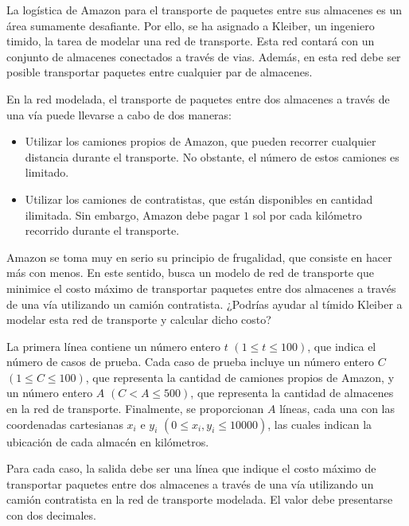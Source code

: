 
La logística de Amazon para el transporte de paquetes entre sus almacenes es un área sumamente desafiante. Por ello, se ha asignado a Kleiber, un ingeniero timido, la tarea de modelar una red de transporte. Esta red contará con un conjunto de almacenes conectados a través de vias. Además, en esta red debe ser posible transportar paquetes entre cualquier par de almacenes.

En la red modelada, el transporte de paquetes entre dos almacenes a través de una vía puede llevarse a cabo de dos maneras:
 \begin{itemize}
    \item Utilizar los camiones propios de Amazon, que pueden recorrer cualquier distancia durante el transporte. No obstante, el número de estos camiones es limitado.
    \item Utilizar los camiones de contratistas, que están disponibles en cantidad ilimitada. Sin embargo, Amazon debe pagar $1$ sol por cada kilómetro recorrido durante el transporte.
\end{itemize}
Amazon se toma muy en serio su principio de frugalidad, que consiste en hacer más con menos. En este sentido, busca un modelo de red de transporte que minimice el costo máximo de transportar paquetes entre dos almacenes a través de una vía utilizando un camión contratista. ¿Podrías ayudar al tímido Kleiber a modelar esta red de transporte y calcular dicho costo?


La primera línea contiene un número entero $t$ $(1 \leq t \leq 100)$, que indica el número de casos de prueba. Cada caso de prueba incluye un número entero $C$ $(1 \leq C \leq 100)$, que representa la cantidad de camiones propios de Amazon, y un número entero $A$ $(C < A \leq 500)$, que representa la cantidad de almacenes en la red de transporte. Finalmente, se proporcionan $A$ líneas, cada una con las coordenadas cartesianas $x_i$ e $y_i$ $(0 \leq x_i, y_i \leq 10000)$, las cuales indican la ubicación de cada almacén en kilómetros.

\outputText

Para cada caso, la salida debe ser una línea que indique el costo máximo de transportar paquetes entre dos almacenes a través de una vía utilizando un camión contratista en la red de transporte modelada. El valor debe presentarse con dos decimales.

